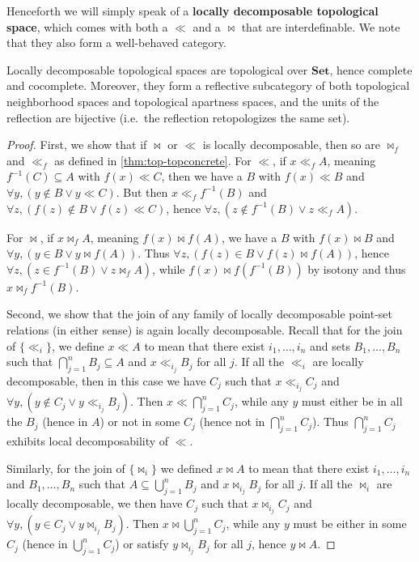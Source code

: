 \documentclass{article}
\def\inv{^{-1}}
\begin{document}
Henceforth we will simply speak of a \textbf{locally decomposable topological space}, which comes with both a $\ll$ and a $\bowtie$ that are interdefinable.
We note that they also form a well-behaved category.

\begin{thm}\label{thm:ldtop-topconcrete}
  Locally decomposable topological spaces are topological over $\mathbf{Set}$, hence complete and cocomplete.
  Moreover, they form a reflective subcategory of both topological neighborhood spaces and topological apartness spaces, and the units of the reflection are bijective (i.e.\ the reflection retopologizes the same set).
\end{thm}
\begin{proof}
  First, we show that if $\bowtie$ or $\ll$ is locally decomposable, then so are $\bowtie_f$ and $\ll_f$ as defined in \cref{thm:top-topconcrete}.
  For $\ll$, if $x\ll_f A$, meaning $f\inv(C)\subseteq A$ with $f(x)\ll C$, then we have a $B$ with $f(x)\ll B$ and $\forall y, (y\notin B \lor y\ll C)$.
  But then $x\ll_f f\inv(B)$ and $\forall z, (f(z)\notin B \lor f(z) \ll C)$, hence $\forall z, (z\notin f\inv(B) \lor z \ll_f A)$.

  For $\bowtie$, if $x\bowtie_f A$, meaning $f(x)\bowtie f(A)$, we have a $B$ with $f(x)\bowtie B$ and $\forall y,(y\in B \lor y\bowtie f(A))$.
  Thus $\forall z, (f(z)\in B \lor f(z)\bowtie f(A))$, hence $\forall z, (z\in f\inv(B) \lor z\bowtie_f A)$, while $f(x) \bowtie f(f\inv(B))$ by isotony and thus $x \bowtie_f f\inv(B)$.

  Second, we show that the join of any family of locally decomposable point-set relations (in either sense) is again locally decomposable.
  Recall that for the join of $\{\ll_i\}$, we define $x\ll A$ to mean that there exist $i_1,\dots,i_n$ and sets $B_1,\dots, B_n$ such that $\bigcap_{j=1}^n B_j \subseteq A$ and $x\ll_{i_j} B_j$ for all $j$.
  If all the $\ll_i$ are locally decomposable, then in this case we have $C_j$ such that $x\ll_{i_j} C_j$ and $\forall y, (y\notin C_j \lor y\ll_{i_j} B_j)$.
  Then $x \ll \bigcap_{j=1}^n C_j$, while any $y$ must either be in all the $B_j$ (hence in $A$) or not in some $C_j$ (hence not in $\bigcap_{j=1}^n C_j$).
  Thus $\bigcap_{j=1}^n C_j$ exhibits local decomposability of $\ll$.

  Similarly, for the join of $\{\bowtie_i\}$ we defined $x\bowtie A$ to mean that there exist $i_1,\dots,i_n$ and $B_1,\dots, B_n$ such that $A\subseteq \bigcup_{j=1}^n B_j$ and $x\bowtie_{i_j} B_j$ for all $j$.
  If all the $\bowtie_i$ are locally decomposable, we then have $C_j$ such that $x\bowtie_{i_j} C_j$ and $\forall y, (y\in C_j \lor y\bowtie_{i_j} B_j)$.
  Then $x\bowtie \bigcup_{j=1}^n C_j$, while any $y$ must be either in some $C_j$ (hence in $\bigcup_{j=1}^n C_j$) or satisfy $y\bowtie_{i_j} B_j$ for all $j$, hence $y\bowtie A$.


\end{proof}
\end{document}
